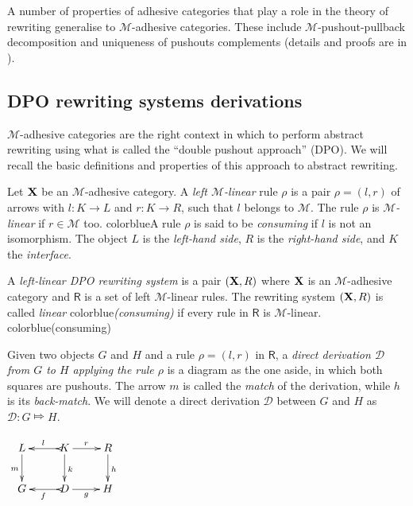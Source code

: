 \documentclass[a4paper,UKenglish,cleveref,pdftex,thm-restate,numberwithinsect,anonymous]{lipics}
\newcommand{\full}[1]{{color{blue}#1}}
\newcommand{\full}[1]{}
\def\R{\mathsf{R}}
\def\X{\textbf {\textup{X}}}
\def\G{\textbf {\textup{G}}}
\newcommand{\dder}[1]{\mathscr{#1}}
\begin{document}
A number of properties of adhesive categories that play a role in the
theory of rewriting generalise to $\mathcal{M}$-adhesive
categories. These include $\mathcal{M}$-pushout-pullback decomposition
and uniqueness of pushouts complements (details and proofs are in
).

\subsection{DPO rewriting systems derivations}\label{subsec:DPO}

$\mathcal{M}$-adhesive categories are the right context in which to
perform abstract rewriting using what is called the ``double pushout
approach'' (DPO). We will recall the basic definitions and properties
of this approach to abstract rewriting.


\begin{definition}
  Let $\X$ be an $\mathcal{M}$-adhesive category. A \emph{left
    $\mathcal{M}$-linear} rule $\rho$ is a pair $\rho = (l,r)$ of
  arrows with $l: K \to L$ and $r: K \to R$, such that $l$ belongs to
  $\mathcal{M}$.  The rule $\rho$ is \emph{$\mathcal{M}$-linear} if
  $r\in \mathcal{M}$ too.
  \full{A rule $\rho$ is said to be
    \emph{consuming} if $l$ is not an isomorphism.}%
  The object $L$ is
  the \emph{left-hand side}, $R$ is the \emph{right-hand side}, and
  $K$ the \emph{interface}. 

  A \emph{left-linear DPO rewriting system} is a pair $(\X, \R)$ where
  $\X$ is an $\mathcal{M}$-adhesive category and $\R$ is a set of left
  $\mathcal{M}$-linear rules. The rewriting system $(\X, \R)$ is
  called \emph{linear}
  \full{\emph{(consuming)}}
  if every rule in $\R$ is
  $\mathcal{M}$-linear.
  \full{(consuming)}

  \noindent
  \parbox{10cm}{\hspace{15pt}Given two objects $G$ and $H$ and a rule
    $\rho=(l,r)$ in $\R$, a \emph{direct derivation $\mathscr{D}$ from
      $G$ to $H$ applying the rule $\rho$} is a diagram as the one
    aside, in which both squares are pushouts. The arrow $m$ is called
    the \emph{match} of the derivation, while $h$ is its
    \emph{back-match}.  We will denote a direct derivation $\dder{D}$
    between $G$ and $H$ as $\dder{D}\colon G\Mapsto H$. }
  \parbox{3cm}{$\xymatrix{L \ar[d]_{m}& K \ar[d]^{k}\ar@{>->}[l]_{l}
      \ar[r]^{r} & R \ar[d]^{h}\\G & \ar@{>->}[l]^{f} D \ar[r]_{g}&
      H}$}
\end{definition}
\end{document}
